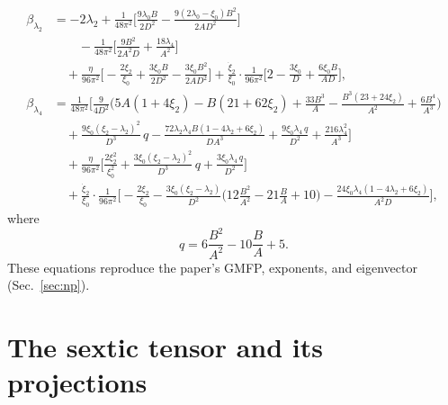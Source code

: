 \documentclass[11pt]{article}
\newcommand{\lfour}{\lambda_4}
\begin{document}
\begin{align}
  \beta_{\lambda_2}&=-2\lambda_2+\frac{1}{48\pi^2}\Bigg[
    \frac{9\lambda_0 B}{2D^2}-\frac{9(2\lambda_0-\xi_0)B^2}{2 A D^2}\Bigg]
    \nonumber\\
  &\qquad-\frac{1}{48\pi^2}\Bigg[
    \frac{9B^2}{2 A^2 D}+\frac{18\lfour}{A^2}\Bigg]\nonumber\\
    &\quad+\frac{\eta}{96\pi^2}\Bigg[-\frac{2\xi_2}{\xi_0}
    +\frac{3\xi_0 B}{2D^2}-\frac{3\xi_0 B^2}{2 A D^2}\Bigg]
    +\frac{\dot\xi_2}{\xi_0}\cdot\frac{1}{96\pi^2}\Bigg[2
    -\frac{3\xi_0}{D}+\frac{6\xi_0 B}{A D}\Bigg],\\
  \beta_{\lfour}&=\frac{1}{48\pi^2}\Bigg[
    \frac{9}{4D^2}\Big(5A(1+4\xi_2)-B(21+62\xi_2)
    +\frac{33B^3}{A}-\frac{B^3(23+24\xi_2)}{A^2}+\frac{6B^4}{A^3}\Big)\nonumber\\
    &\quad+\frac{9\xi_0(\xi_2-\lambda_2)^2}{D^3}\,q
    -\frac{72\lambda_2\lfour B(1-4\lambda_2+6\xi_2)}{D A^3}
    +\frac{9\xi_0\lfour\,q}{D^2}+\frac{216\lfour^2}{A^3}\Bigg]\nonumber\\
    &\quad+\frac{\eta}{96\pi^2}\Bigg[\frac{2\xi_2^2}{\xi_0^2}
    +\frac{3\xi_0(\xi_2-\lambda_2)^2}{D^3}\,q
    +\frac{3\xi_0\lfour\,q}{D^2}\Bigg]\nonumber\\
    &\quad+\frac{\dot\xi_2}{\xi_0}\cdot\frac{1}{96\pi^2}\Bigg[
    -\frac{2\xi_2}{\xi_0}-\frac{3\xi_0(\xi_2-\lambda_2)}{D^2}
    \Big(12\frac{B^2}{A^2}-21\frac{B}{A}+10\Big)
    -\frac{24\xi_0\lfour(1-4\lambda_2+6\xi_2)}{A^2 D}\Bigg],
\end{align}
where
\begin{equation}
  q=6\frac{B^2}{A^2}-10\frac{B}{A}+5 .
\end{equation}
These equations reproduce the paper's GMFP, exponents, and eigenvector
(Sec.~\ref{sec:np}).

\section{The sextic tensor and its projections}
\label{app:sextic}
\end{document}
